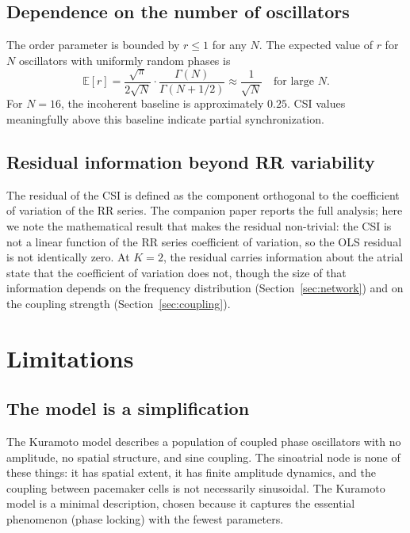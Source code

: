 \documentclass[11pt]{article}
\begin{document}
\subsection{Dependence on the number of oscillators}

The order parameter is bounded by $r \leq 1$ for any $N$. The expected
value of $r$ for $N$ oscillators with uniformly random phases is
\begin{equation}
\mathbb{E}[r] = \frac{\sqrt{\pi}}{2\sqrt{N}} \cdot
\frac{\Gamma(N)}{\Gamma(N + 1/2)} \approx \frac{1}{\sqrt{N}}
\quad \text{for large } N.
\label{eq:baseline}
\end{equation}
For $N = 16$, the incoherent baseline is approximately $0.25$. CSI
values meaningfully above this baseline indicate partial
synchronization.

\subsection{Residual information beyond RR variability}

The residual of the CSI is defined as the component orthogonal to the
coefficient of variation of the RR series. The companion paper reports
the full analysis; here we note the mathematical result that makes the
residual non-trivial: the CSI is not a linear function of the RR series
coefficient of variation, so the OLS residual is not identically zero.
At $K = 2$, the residual carries information about the atrial state that
the coefficient of variation does not, though the size of that
information depends on the frequency distribution (Section~\ref{sec:network})
and on the coupling strength (Section~\ref{sec:coupling}).

\section{Limitations}\label{sec:limitations}

\subsection{The model is a simplification}

The Kuramoto model describes a population of coupled phase oscillators
with no amplitude, no spatial structure, and sine coupling. The
sinoatrial node is none of these things: it has spatial extent, it has
finite amplitude dynamics, and the coupling between pacemaker cells is
not necessarily sinusoidal. The Kuramoto model is a minimal description,
chosen because it captures the essential phenomenon (phase locking) with
the fewest parameters.
\end{document}
